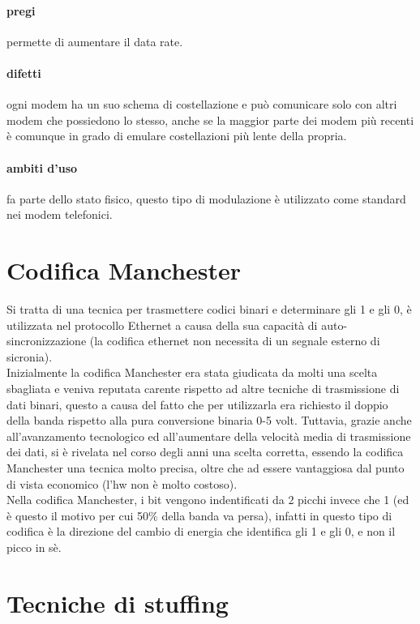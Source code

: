 \documentclass{article}
\begin{document}
\paragraph{pregi} permette di aumentare il data rate.

\paragraph{difetti} ogni modem ha un suo schema di costellazione e può
comunicare solo con altri modem che possiedono lo stesso, anche se la maggior
parte dei modem più recenti è comunque in grado di emulare costellazioni più
lente della propria.

\paragraph{ambiti d'uso} fa parte dello stato fisico, questo tipo di modulazione
è utilizzato come standard nei modem telefonici.

\section{Codifica Manchester}

Si tratta di una tecnica per trasmettere codici binari e determinare gli 1 e gli
0, è utilizzata nel protocollo Ethernet a causa della sua capacità di
auto-sincronizzazione (la codifica ethernet non necessita di un segnale esterno
di sicronia).\\
Inizialmente la codifica Manchester era stata giudicata da molti una scelta
sbagliata e veniva reputata carente rispetto ad altre tecniche di trasmissione
di dati binari, questo a causa del fatto che per utilizzarla era richiesto il
doppio della banda rispetto alla pura conversione binaria 0-5 volt. Tuttavia,
grazie anche all'avanzamento tecnologico ed all'aumentare della velocità media
di trasmissione dei dati, si è rivelata nel corso degli anni una scelta
corretta, essendo la codifica Manchester una tecnica molto precisa, oltre che ad
essere vantaggiosa dal punto di vista economico (l'hw non è molto costoso).\\
Nella codifica Manchester, i bit vengono indentificati da 2 picchi invece che 1
(ed è questo il motivo per cui 50\% della banda va persa), infatti in questo
tipo di codifica è la direzione del cambio di energia che identifica gli 1 e gli
0, e non il picco in sè.

\section{Tecniche di stuffing}
\end{document}
